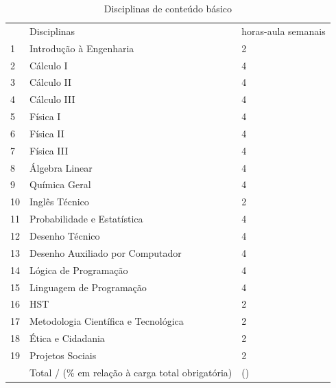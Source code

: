 \begin{longtable}{|p{0.8cm}|p{7.5cm}|p{2.0cm}|}
	\caption{Disciplinas de conteúdo básico}\label{tab5} 
	\vspace{-0.25cm}
	\\ \hline 
	\cellcolor{\cinza} & \cellcolor{\cinza}Disciplinas & \cellcolor{\cinza}horas-aula semanais  \\ 
	\hline
	1 &  Introdução à Engenharia  &  2 \\ \hline
	2 &  Cálculo I  &  4 \\ \hline
	3 &  Cálculo II  &  4 \\ \hline
	4 &  Cálculo III  &  4 \\ \hline
	5 &  Física I  &  4 \\ \hline
	6 &  Física II  &  4 \\ \hline
	7 &  Física III  &  4 \\ \hline
	8 &  Álgebra Linear  &  4 \\ \hline
	9 &  Química Geral  &  4 \\ \hline
	10 &  Inglês Técnico  &  2 \\ \hline
	11 &  Probabilidade e Estatística  &  4 \\ \hline
	12 &  Desenho Técnico  &  4 \\ \hline
	13 &  Desenho Auxiliado por Computador  &  4 \\ \hline
	14 &  Lógica de Programação  &  4 \\ \hline
	15 &  Linguagem de Programação  &  4 \\ \hline
	16 &  HST  &  2 \\ \hline
	17 &  Metodologia Científica e Tecnológica  &  2 \\ \hline
	18 &  Ética e Cidadania  &  2 \\ \hline
	19 &  Projetos Sociais  &  2 \\ \hline
	&  Total / (\% em relação à carga total obrigatória)  &  \CHBASICACR(\CHBASICAPEMIN) \\ \hline
\end{longtable}

